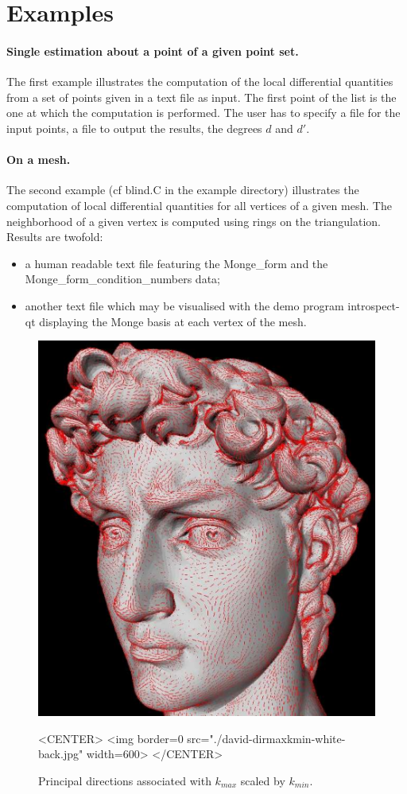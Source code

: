 \section{Examples} 

\paragraph{Single estimation about a point of a given point set.}
The first example illustrates the computation of the local
differential quantities from a set of points given in a text file as
input. The first point of the list is the one at which the computation
is performed. The user has to specify a file for the input points, a
file to output the results, the degrees $d$ and $d'$.

\paragraph{On a mesh.}
The second example (cf blind.C in the example directory) illustrates
the computation of local differential quantities for all vertices of a
given mesh. The neighborhood of a given vertex is computed using rings on
the triangulation. Results are twofold:
\begin{itemize}
\item
a human readable text file featuring the Monge\_form and the
Monge\_form\_condition\_numbers data;
\item
another text file which may be visualised with the demo program
introspect-qt displaying the Monge basis at each vertex of the mesh.
\end{itemize}


\begin{figure}[!ht]
\begin{ccTexOnly}
\centerline{
\includegraphics[width=.5\linewidth]{Jet_fitting_3/david-dirmaxkmin-jpg-white-back}}
\end{ccTexOnly}
\caption{Principal directions associated with $k_{max}$ scaled by $k_{min}$.}

\begin{ccHtmlOnly}
<CENTER> <img border=0 src="./david-dirmaxkmin-white-back.jpg" width=600>
</CENTER>
\end{ccHtmlOnly}
\end{figure}



